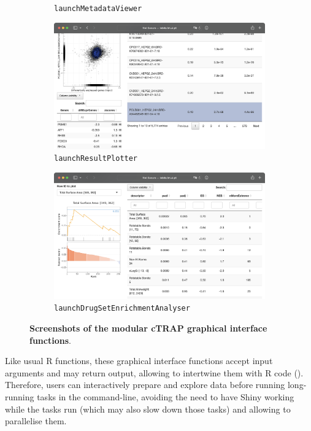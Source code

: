 \begin{figure}[!ht]
\begin{subfigure}[h]{0.3\textwidth}
		\caption{\footnotesize{\texttt{launchMetadataViewer}}}
	\end{subfigure}
	\begin{subfigure}[h]{0.45\textwidth}
		\includegraphics[width=\textwidth]{images/ctrap/ui/launchResultPlotter}
		\caption{\footnotesize{\texttt{launchResultPlotter}}}
	\end{subfigure}
	\begin{subfigure}[h]{0.45\textwidth}
		\includegraphics[width=\textwidth]{images/ctrap/ui/launchDrugSetEnrichmentAnalyser}
		\caption{\footnotesize{\texttt{launchDrugSetEnrichmentAnalyser}}}
	\end{subfigure}
	\caption[cTRAP graphical interface functions]{\textbf{Screenshots of the modular cTRAP graphical interface functions}.}
	\label{fig:ctrap-ui-functions}
\end{figure}

Like usual R functions, these graphical interface functions accept input arguments and may return output, allowing to intertwine them with R code (). Therefore, users can interactively prepare and explore data before running long-running tasks in the command-line, avoiding the need to have Shiny working while the tasks run (which may also slow down those tasks) and allowing to parallelise them.

